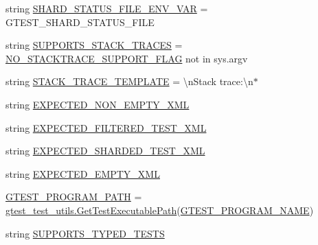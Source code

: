 \begin{DoxyCompactItemize}
\item 
string \mbox{\hyperlink{namespacegoogletest-master_1_1googletest_1_1test_1_1gtest__xml__output__unittest_aef45ea57afd8409724b9fc4a90c4c2e1}{S\+H\+A\+R\+D\+\_\+\+S\+T\+A\+T\+U\+S\+\_\+\+F\+I\+L\+E\+\_\+\+E\+N\+V\+\_\+\+V\+AR}} = \textquotesingle{}G\+T\+E\+S\+T\+\_\+\+S\+H\+A\+R\+D\+\_\+\+S\+T\+A\+T\+U\+S\+\_\+\+F\+I\+LE\textquotesingle{}
\item 
string \mbox{\hyperlink{namespacegoogletest-master_1_1googletest_1_1test_1_1gtest__xml__output__unittest_aa44d6530c43e3f1430441ff7fb9c086c}{S\+U\+P\+P\+O\+R\+T\+S\+\_\+\+S\+T\+A\+C\+K\+\_\+\+T\+R\+A\+C\+ES}} = \mbox{\hyperlink{namespacegoogletest-master_1_1googletest_1_1test_1_1gtest__xml__output__unittest_aedff93465d4c404f96e7f115cd17c785}{N\+O\+\_\+\+S\+T\+A\+C\+K\+T\+R\+A\+C\+E\+\_\+\+S\+U\+P\+P\+O\+R\+T\+\_\+\+F\+L\+AG}} not in sys.\+argv
\item 
string \mbox{\hyperlink{namespacegoogletest-master_1_1googletest_1_1test_1_1gtest__xml__output__unittest_af113a7bbc386f077b39904698cdc719f}{S\+T\+A\+C\+K\+\_\+\+T\+R\+A\+C\+E\+\_\+\+T\+E\+M\+P\+L\+A\+TE}} = \textquotesingle{}\textbackslash{}n\+Stack trace\+:\textbackslash{}n$\ast$\textquotesingle{}
\item 
string \mbox{\hyperlink{namespacegoogletest-master_1_1googletest_1_1test_1_1gtest__xml__output__unittest_a73b117a830696d35d8141e5bc6bc6a46}{E\+X\+P\+E\+C\+T\+E\+D\+\_\+\+N\+O\+N\+\_\+\+E\+M\+P\+T\+Y\+\_\+\+X\+ML}}
\item 
string \mbox{\hyperlink{namespacegoogletest-master_1_1googletest_1_1test_1_1gtest__xml__output__unittest_ac6e2c8b9476aed2c20b9ce355b955713}{E\+X\+P\+E\+C\+T\+E\+D\+\_\+\+F\+I\+L\+T\+E\+R\+E\+D\+\_\+\+T\+E\+S\+T\+\_\+\+X\+ML}}
\item 
string \mbox{\hyperlink{namespacegoogletest-master_1_1googletest_1_1test_1_1gtest__xml__output__unittest_aa89944e0deaef28e27f9f1a2bddbcd49}{E\+X\+P\+E\+C\+T\+E\+D\+\_\+\+S\+H\+A\+R\+D\+E\+D\+\_\+\+T\+E\+S\+T\+\_\+\+X\+ML}}
\item 
string \mbox{\hyperlink{namespacegoogletest-master_1_1googletest_1_1test_1_1gtest__xml__output__unittest_abd3e38182f539421868f100b7fa34985}{E\+X\+P\+E\+C\+T\+E\+D\+\_\+\+E\+M\+P\+T\+Y\+\_\+\+X\+ML}}
\item 
\mbox{\hyperlink{namespacegoogletest-master_1_1googletest_1_1test_1_1gtest__xml__output__unittest_a0d99e98ad180ce6b0b2a617d6b57fe6c}{G\+T\+E\+S\+T\+\_\+\+P\+R\+O\+G\+R\+A\+M\+\_\+\+P\+A\+TH}} = \mbox{\hyperlink{namespacegoogletest-master_1_1googletest_1_1test_1_1gtest__test__utils_a78bbc69ac699e750a6a29188caa643c4}{gtest\+\_\+test\+\_\+utils.\+Get\+Test\+Executable\+Path}}(\mbox{\hyperlink{namespacegoogletest-master_1_1googletest_1_1test_1_1gtest__xml__output__unittest_a0965a84cceaedb249813aff903293748}{G\+T\+E\+S\+T\+\_\+\+P\+R\+O\+G\+R\+A\+M\+\_\+\+N\+A\+ME}})
\item 
string \mbox{\hyperlink{namespacegoogletest-master_1_1googletest_1_1test_1_1gtest__xml__output__unittest_aed7867ea4492e742e43acfeeab381773}{S\+U\+P\+P\+O\+R\+T\+S\+\_\+\+T\+Y\+P\+E\+D\+\_\+\+T\+E\+S\+TS}}
\end{DoxyCompactItemize}


